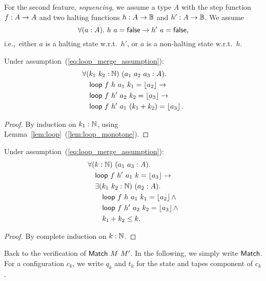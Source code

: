 For the second feature, \emph{sequencing}, we assume a type $A$ with the step function $f : A \rightarrow A$ and two halting functions
$h : A \rightarrow \mathbb{B}$ and $h' : A \rightarrow \mathbb{B}$.  We assume
\begin{equation}
  \label{eq:loop_merge_assumption}
  \forall(a:A).~h~a = \mathsf{false} \rightarrow h'~a = \mathsf{false},
\end{equation}
i.e.,\ either $a$ is a halting state w.r.t.\ $h'$, or $a$ is a non-halting state w.r.t.\ $h$.
\begin{lemma}
  \label{lem:loop_merge}
  Under assumption~(\ref{eq:loop_merge_assumption}):
  \begin{align*}
    & \forall (k_1~k_2:\mathbb{N})~(a_1~a_2~a_3 : A).\\
    & \quad \mathsf{loop}~f~h ~a_1~k_1       = \left\lfloor {a_2} \right\rfloor \rightarrow\\
    & \quad \mathsf{loop}~f~h'~a_2~k_2       = \left\lfloor {a_3} \right\rfloor \rightarrow\\
    & \quad \mathsf{loop}~f~h'~a_1~(k_1+k_2) = \left\lfloor {a_3} \right\rfloor.
  \end{align*}
\end{lemma}
\begin{proof}
  By induction on $k_1:\mathbb{N}$, using Lemma~\ref{lem:loop}~(\ref{lem:loop_monotone}).
\end{proof}
\begin{lemma}
  \label{lem:loop_split}
  Under assumption~(\ref{eq:loop_merge_assumption}):
  \begin{align*}
    & \forall (k:\mathbb{N})~(a_1~a_3 : A).\\
    & \quad \mathsf{loop}~f~h'~a_1~k = \left\lfloor {a_3} \right\rfloor \rightarrow \\
    & \quad \exists (k_1~k_2:\mathbb{N})~(a_2:A).\\
    & \quad \quad \mathsf{loop}~f~h ~a_1~k_1 = \left\lfloor {a_2} \right\rfloor \land\\
    & \quad \quad \mathsf{loop}~f~h'~a_2~k_2 = \left\lfloor {a_3} \right\rfloor \land\\
    & \quad \quad k_1 + k_2 \leq k.
  \end{align*}
\end{lemma}
\begin{proof}
  By complete induction on $k:\mathbb{N}$.
\end{proof}


Back to the verification of $\mathsf{Match}~M~M'$.  In the following, we simply write $\mathsf{Match}$.  For a configuration $c_k$, we write $q_k$ and $t_k$ for the
state and tapes component of $c_k$.


